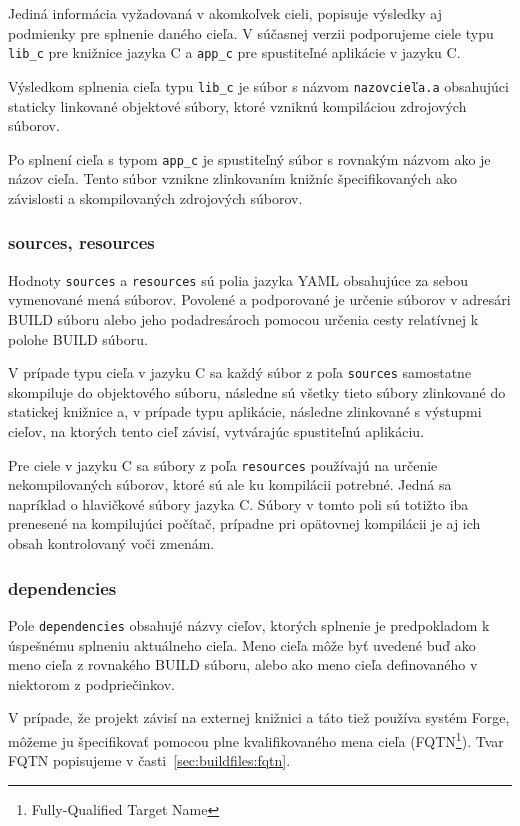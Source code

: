 Jediná informácia vyžadovaná v akomkoľvek cieli, popisuje výsledky aj podmienky pre
splnenie daného cieľa. V súčasnej verzii podporujeme ciele typu \texttt{lib\_c} pre
knižnice jazyka C a \texttt{app\_c} pre spustiteľné aplikácie v jazyku C.

Výsledkom splnenia cieľa typu \texttt{lib\_c} je súbor s názvom \texttt{nazovcieľa.a}
obsahujúci staticky linkované objektové súbory, ktoré vzniknú kompiláciou zdrojových
súborov.

Po splnení cieľa s typom \texttt{app\_c} je spustiteľný súbor s rovnakým názvom
ako je názov cieľa. Tento súbor vznikne zlinkovaním knižníc špecifikovaných
ako závislosti a skompilovaných zdrojových súborov.

\subsubsection{sources, resources}

Hodnoty \texttt{sources} a \texttt{resources} sú polia jazyka YAML obsahujúce
za sebou vymenované mená súborov. Povolené a podporované je určenie súborov v adresári
BUILD súboru alebo jeho podadresároch pomocou určenia cesty relatívnej k polohe
BUILD súboru.

V prípade typu cieľa v jazyku C sa každý súbor z poľa \texttt{sources} samostatne skompiluje
do objektového súboru, následne sú všetky tieto súbory zlinkované do statickej knižnice a, v prípade
typu aplikácie, následne zlinkované s výstupmi cieľov, na ktorých tento cieľ závisí, vytvárajúc
spustiteľnú aplikáciu.

Pre ciele v jazyku C sa súbory z poľa \texttt{resources} používajú na určenie nekompilovaných
súborov, ktoré sú ale ku kompilácii potrebné. Jedná sa napríklad o hlavičkové súbory jazyka
C. Súbory v tomto poli sú totižto iba prenesené na kompilujúci počítač, prípadne pri
opätovnej kompilácii je aj ich obsah kontrolovaný voči zmenám.

\subsubsection{dependencies}

Pole \texttt{dependencies} obsahujé názvy cieľov, ktorých splnenie je predpokladom
k úspešnému splneniu aktuálneho cieľa. Meno cieľa môže byť uvedené buď ako meno cieľa
z rovnakého BUILD súboru, alebo ako meno cieľa definovaného v niektorom z podpriečinkov.

V prípade, že projekt závisí na externej knižnici a táto tiež používa systém Forge,
môžeme ju špecifikovať pomocou plne kvalifikovaného mena cieľa (FQTN\footnote{Fully-Qualified Target Name}).
Tvar FQTN popisujeme v časti~\ref{sec:buildfiles:fqtn}.

